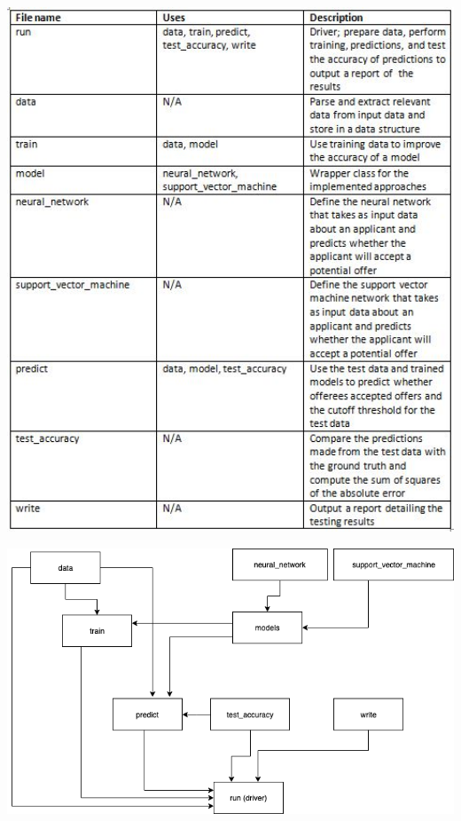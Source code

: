 \documentclass{article}
\begin{document}
\begin{normalsize}
        \begin{center}
        \includegraphics[width=400pt]{images/architectureTable.JPG}
        \end{center}
        
        \begin{center}
        \includegraphics[width=400pt]{images/architectureFlowchart.png}
        \end{center}


\end{normalsize}
\end{document}
